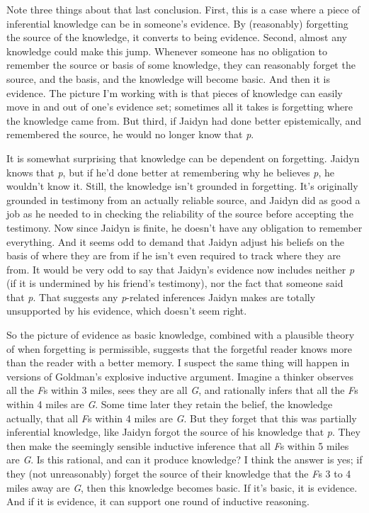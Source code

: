 \documentclass[
  11pt,
]{book}
\begin{document}
Note three things about that last conclusion. First, this is a case where a piece of inferential knowledge can be in someone's evidence. By (reasonably) forgetting the source of the knowledge, it converts to being evidence. Second, almost any knowledge could make this jump. Whenever someone has no obligation to remember the source or basis of some knowledge, they can reasonably forget the source, and the basis, and the knowledge will become basic. And then it is evidence. The picture I'm working with is that pieces of knowledge can easily move in and out of one's evidence set; sometimes all it takes is forgetting where the knowledge came from. But third, if Jaidyn had done better epistemically, and remembered the source, he would no longer know that \emph{p}.

It is somewhat surprising that knowledge can be dependent on forgetting. Jaidyn knows that \emph{p}, but if he'd done better at remembering why he believes \emph{p}, he wouldn't know it. Still, the knowledge isn't grounded in forgetting. It's originally grounded in testimony from an actually reliable source, and Jaidyn did as good a job as he needed to in checking the reliability of the source before accepting the testimony. Now since Jaidyn is finite, he doesn't have any obligation to remember everything. And it seems odd to demand that Jaidyn adjust his beliefs on the basis of where they are from if he isn't even required to track where they are from. It would be very odd to say that Jaidyn's evidence now includes neither \emph{p} (if it is undermined by his friend's testimony), nor the fact that someone said that \emph{p}. That suggests any \emph{p}-related inferences Jaidyn makes are totally unsupported by his evidence, which doesn't seem right.

So the picture of evidence as basic knowledge, combined with a plausible theory of when forgetting is permissible, suggests that the forgetful reader knows more than the reader with a better memory. I suspect the same thing will happen in versions of Goldman's explosive inductive argument. Imagine a thinker observes all the \emph{F}s within 3 miles, sees they are all \emph{G}, and rationally infers that all the \emph{F}s within 4 miles are \emph{G}. Some time later they retain the belief, the knowledge actually, that all \emph{F}s within 4 miles are \emph{G}. But they forget that this was partially inferential knowledge, like Jaidyn forgot the source of his knowledge that \emph{p}. They then make the seemingly sensible inductive inference that all \emph{F}s within 5 miles are \emph{G}. Is this rational, and can it produce knowledge? I think the answer is yes; if they (not unreasonably) forget the source of their knowledge that the \emph{F}s 3 to 4 miles away are \emph{G}, then this knowledge becomes basic. If it's basic, it is evidence. And if it is evidence, it can support one round of inductive reasoning.
\end{document}
